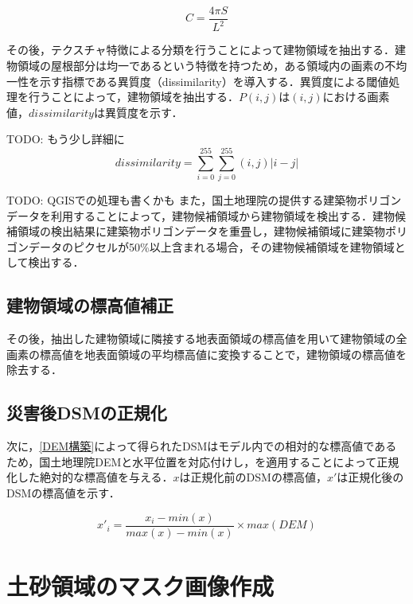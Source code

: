       \begin{equation}
        \label{円形度}
        C = \dfrac{4 \pi S} {L^2} 
      \end{equation}

      その後，テクスチャ特徴による分類を行うことによって建物領域を抽出する．建物領域の屋根部分は均一であるという特徴を持つため，ある領域内の画素の不均一性を示す指標である異質度（dissimilarity）\cite{論文手法3}を導入する．異質度による閾値処理を行うことによって，建物領域を抽出する．$P(i,j)$は$(i,j)$における画素値，$dissimilarity$は異質度を示す．

      TODO: もう少し詳細に
      \begin{equation}
        \label{異質度}
        dissimilarity = \sum_{i=0}^{255} \sum_{j=0}^{255} (i,j) |i-j|
      \end{equation}

      TODO: QGISでの処理も書くかも
      また，国土地理院の提供する建築物ポリゴンデータ\cite{}を利用することによって，建物候補領域から建物領域を検出する．建物候補領域の検出結果に建築物ポリゴンデータを重畳し，建物候補領域に建築物ポリゴンデータのピクセルが50\%以上含まれる場合，その建物候補領域を建物領域として検出する．

    \subsection{建物領域の標高値補正}
      その後，抽出した建物領域に隣接する地表面領域の標高値を用いて建物領域の全画素の標高値を地表面領域の平均標高値に変換することで，建物領域の標高値を除去する．

    \subsection{災害後DSMの正規化}
      次に，\ref{DEM構築}によって得られたDSMはモデル内での相対的な標高値であるため，国土地理院DEMと水平位置を対応付けし，を適用することによって正規化した絶対的な標高値を与える．$x$は正規化前のDSMの標高値，$x'$は正規化後のDSMの標高値を示す．

      \begin{equation}
        \label{正規化}
        x'_{i} = \dfrac{x_{i} - min(x)} {max(x) - min(x)} \times max(DEM) 
      \end{equation}


  \section{土砂領域のマスク画像作成}
    \label{土砂マスク}

